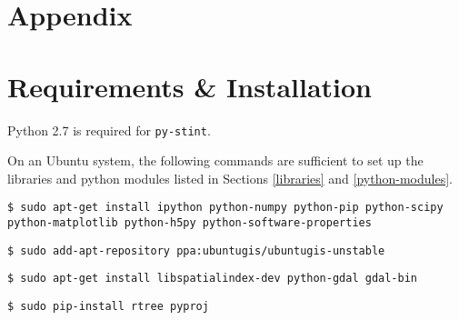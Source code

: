 \documentclass[twoside,a4paper]{refart}
\begin{document}
\section*{Appendix}
\appendix
\section{Requirements \& Installation}
\label{setup}

Python 2.7 is required for \texttt{py-stint}.

On an Ubuntu system, the following commands are sufficient to set up the libraries and python modules listed in Sections \ref{libraries} and \ref{python-modules}.

\texttt{\$ sudo apt-get install ipython python-numpy python-pip python-scipy python-matplotlib python-h5py python-software-properties}

\texttt{\$ sudo add-apt-repository ppa:ubuntugis/ubuntugis-unstable}

\texttt{\$ sudo apt-get install libspatialindex-dev python-gdal gdal-bin}

\texttt{\$ sudo pip-install rtree pyproj}
\end{document}

